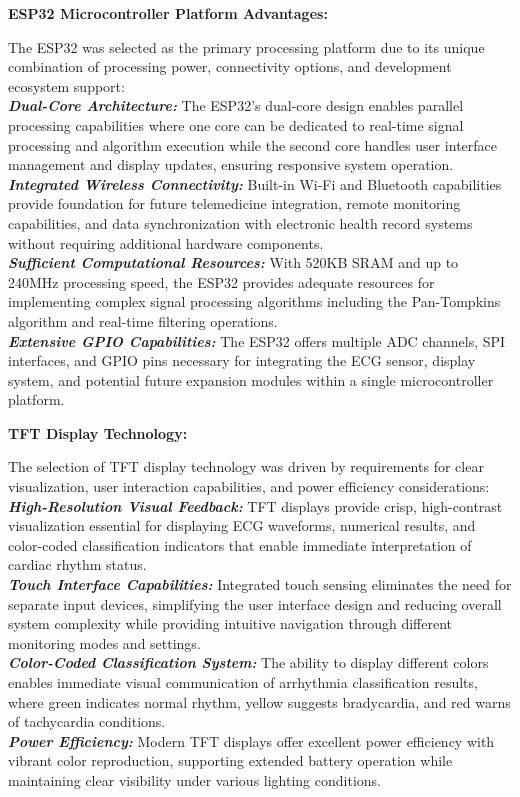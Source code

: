 \documentclass[12pt,a4paper]{article}
\begin{document}
\begin{multicols}{2}
\vspace{0.5cm}

\textbf{ESP32 Microcontroller Platform Advantages:}

The ESP32 was selected as the primary processing platform due to its unique combination of processing power, connectivity options, and development ecosystem support:\\
\textit{\textbf{Dual-Core Architecture:}} The ESP32's dual-core design enables parallel processing capabilities where one core can be dedicated to real-time signal processing and algorithm execution while the second core handles user interface management and display updates, ensuring responsive system operation.\\
\textit{\textbf{Integrated Wireless Connectivity:}} Built-in Wi-Fi and Bluetooth capabilities provide foundation for future telemedicine integration, remote monitoring capabilities, and data synchronization with electronic health record systems without requiring additional hardware components.\\
\textit{\textbf{Sufficient Computational Resources:}} With 520KB SRAM and up to 240MHz processing speed, the ESP32 provides adequate resources for implementing complex signal processing algorithms including the Pan-Tompkins algorithm and real-time filtering operations.\\
\textit{\textbf{Extensive GPIO Capabilities:}} The ESP32 offers multiple ADC channels, SPI interfaces, and GPIO pins necessary for integrating the ECG sensor, display system, and potential future expansion modules within a single microcontroller platform.

\vspace{0.5cm}

\textbf{TFT Display Technology:}

The selection of TFT display technology was driven by requirements for clear visualization, user interaction capabilities, and power efficiency considerations:\\
\textit{\textbf{High-Resolution Visual Feedback:}} TFT displays provide crisp, high-contrast visualization essential for displaying ECG waveforms, numerical results, and color-coded classification indicators that enable immediate interpretation of cardiac rhythm status.\\
\textit{\textbf{Touch Interface Capabilities:}} Integrated touch sensing eliminates the need for separate input devices, simplifying the user interface design and reducing overall system complexity while providing intuitive navigation through different monitoring modes and settings.\\
\textit{\textbf{Color-Coded Classification System:}} The ability to display different colors enables immediate visual communication of arrhythmia classification results, where green indicates normal rhythm, yellow suggests bradycardia, and red warns of tachycardia conditions.\\
\textit{\textbf{Power Efficiency:}} Modern TFT displays offer excellent power efficiency with vibrant color reproduction, supporting extended battery operation while maintaining clear visibility under various lighting conditions.  
\end{multicols}
\end{document}
